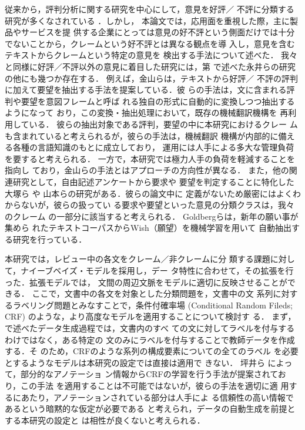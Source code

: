 \documentclass[japanese]{jnlp_1.4}
\def\sec#1{}
\begin{document}
従来から，評判分析に関する研究を中心にして，意見を好評／
不評に分類する研究が多くなされている\cite{sa2} ．しかし，
本論文では，応用面を重視した際，主に製品やサービスを提
供する企業にとっては意見の好不評という側面だけでは十分
でないことから，クレームという好不評とは異なる観点を導
入し，意見を含むテキストからクレームという特定の意見を
検出する手法について述べた．
我々と同様に好評／不評以外の意見に着目した研究には，第
\sec{hajimeni}で述べた永井らの研究\cite{nagai1,nagai2}
の他にも幾つか存在する．
例えば，金山ら\cite{kanayama2005a}は，テキストから好評／
不評の評判に加えて要望を抽出する手法を提案している．彼
らの手法は，文に含まれる評判や要望を意図フレームと呼ば
れる独自の形式に自動的に変換しつつ抽出するようになって
おり，この変換・抽出処理において，既存の機械翻訳機構を
再利用している．
彼らの抽出対象である評判，要望の中に本研究におけるクレー
ムも含まれていると考えられるが，彼らの手法は，機械翻訳
機構が内部的に備える各種の言語知識のもとに成立しており，
運用には人手による多大な管理負荷を要すると考えられる．
一方で，本研究では極力人手の負荷を軽減することを指向し
ており，金山らの手法とはアプローチの方向性が異なる．
また，他の関連研究として，自由記述アンケートから要求や
要望を判定することに特化した大塚ら\cite{otsuka2004a} や
山本ら\cite{yamamoto2006a}の研究がある．彼らの論文中に
定義がないため厳密にはよくわからないが，彼らの扱ってい
る要求や要望といった意見の分類クラスは，我々のクレーム
の一部分に該当すると考えられる．
Goldbergら\cite{goldberg2009a}は，新年の願い事が集めら
れたテキストコーパスからWish（願望）を機械学習を用いて
自動抽出する研究を行っている．

本研究では，レビュー中の各文をクレーム／非クレームに分
類する課題に対して，ナイーブベイズ・モデルを採用し，デー
タ特性に合わせて，その拡張を行った．拡張モデルでは，
文間の周辺文脈をモデルに適切に反映させることができる．
ここで，文書中の各文を対象とした分類問題を，文書中の文
系列に対するラベリング問題とみなすことで，条件付確率場
(Conditional Random Fileds; CRF) \cite{lafferty2001a}
のような，より高度なモデルを適用することについて検討す
る．
まず，\sec{gen}で述べたデータ生成過程では，文書内のすべ
ての文に対してラベルを付与するわけではなく，ある特定の
文のみにラベルを付与することで教師データを作成する．そ
のため，CRFのような系列の構成要素についての全てのラベル
を必要とするようなモデルは本研究の設定では直接は適用で
きない．
坪井ら\cite{tsuboi2009a} によって，部分的なアノテーショ
ン情報からCRFの学習を行う手法が提案されており，この手法
を適用することは不可能ではないが，彼らの手法を適切に適
用するにあたり，アノテーションされている部分は人手によ
る信頼性の高い情報であるという暗黙的な仮定が必要である
と考えられ，データの自動生成を前提とする本研究の設定と
は相性が良くないと考えられる．
\end{document}
